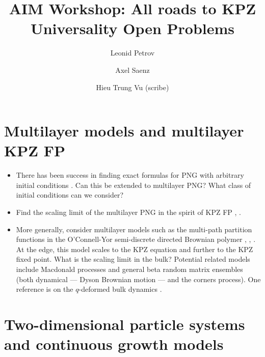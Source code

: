 \documentclass{article}
\title{AIM Workshop: All roads to KPZ Universality Open Problems}
\author{Leonid Petrov \and Axel Saenz \and  Hieu Trung Vu (scribe) }
\theoremstyle{definition}
\begin{document}
\maketitle



\section{Multilayer models and multilayer KPZ FP}
\begin{itemize}
	\item There has been success in finding exact formulas for PNG with arbitrary initial conditions
		\cite{matetski2022polynuclear}.
		Can this be extended to multilayer PNG?
		What class of initial conditions can we consider?
	\item Find the scaling limit of the multilayer PNG in the spirit of KPZ FP
		\cite{matetski2017kpz}, \cite{matetski2022polynuclear}.
	\item More generally, consider multilayer models such as the multi-path partition functions in the
		O'Connell-Yor semi-discrete directed Brownian polymer
		\cite[Theorem~3.1 and subsequent SDEs]{Oconnell2009_Toda}, \cite[Definition~4.1.26]{BorodinCorwin2011Macdonald},
		\cite[Section~8.4]{BorodinPetrov2013NN}.
		At the edge, this model scales to the KPZ equation
		and further to the KPZ fixed point. What is the scaling limit in the bulk?
		Potential related models include Macdonald processes and general beta random matrix ensembles (both dynamical --- Dyson
		Brownian motion --- and the corners process).
		One reference is on the $q$-deformed bulk dynamics \cite{corwin2015stationary}.
\end{itemize}

\section{Two-dimensional particle systems and continuous growth models}
\end{document}
